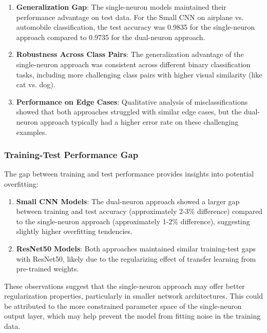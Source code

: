 \begin{enumerate}
\item \textbf{Generalization Gap}: The single-neuron models maintained their performance advantage on test data. For the Small CNN on airplane vs. automobile classification, the test accuracy was 0.9835 for the single-neuron approach compared to 0.9735 for the dual-neuron approach.

\item \textbf{Robustness Across Class Pairs}: The generalization advantage of the single-neuron approach was consistent across different binary classification tasks, including more challenging class pairs with higher visual similarity (like cat vs. dog).

\item \textbf{Performance on Edge Cases}: Qualitative analysis of misclassifications showed that both approaches struggled with similar edge cases, but the dual-neuron approach typically had a higher error rate on these challenging examples.
\end{enumerate}

\subsubsection{Training-Test Performance Gap}

The gap between training and test performance provides insights into potential overfitting:

\begin{enumerate}
\item \textbf{Small CNN Models}: The dual-neuron approach showed a larger gap between training and test accuracy (approximately 2-3\% difference) compared to the single-neuron approach (approximately 1-2\% difference), suggesting slightly higher overfitting tendencies.

\item \textbf{ResNet50 Models}: Both approaches maintained similar training-test gaps with ResNet50, likely due to the regularizing effect of transfer learning from pre-trained weights.
\end{enumerate}

These observations suggest that the single-neuron approach may offer better regularization properties, particularly in smaller network architectures. This could be attributed to the more constrained parameter space of the single-neuron output layer, which may help prevent the model from fitting noise in the training data.

